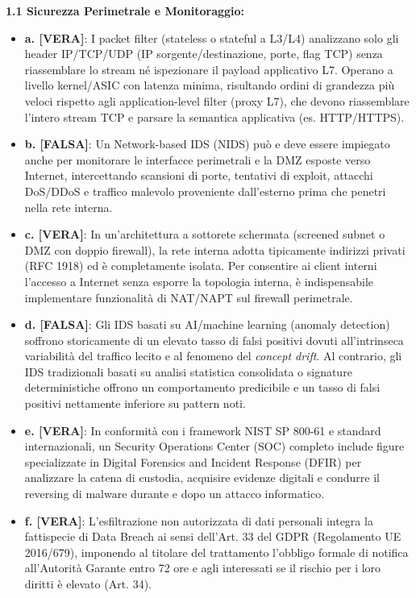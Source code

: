 \documentclass[11pt,a4paper]{article}
\begin{document}
\begin{solutionbox}
\textbf{1.1 Sicurezza Perimetrale e Monitoraggio:}
\begin{itemize}
    \item \textbf{a. [VERA]}: I packet filter (stateless o stateful a L3/L4) analizzano solo gli header IP/TCP/UDP (IP sorgente/destinazione, porte, flag TCP) senza riassemblare lo stream né ispezionare il payload applicativo L7. Operano a livello kernel/ASIC con latenza minima, risultando ordini di grandezza più veloci rispetto agli application-level filter (proxy L7), che devono riassemblare l'intero stream TCP e parsare la semantica applicativa (es. HTTP/HTTPS).
    \item \textbf{b. [FALSA]}: Un Network-based IDS (NIDS) può e deve essere impiegato anche per monitorare le interfacce perimetrali e la DMZ esposte verso Internet, intercettando scansioni di porte, tentativi di exploit, attacchi DoS/DDoS e traffico malevolo proveniente dall'esterno prima che penetri nella rete interna.
    \item \textbf{c. [VERA]}: In un'architettura a sottorete schermata (screened subnet o DMZ con doppio firewall), la rete interna adotta tipicamente indirizzi privati (RFC 1918) ed è completamente isolata. Per consentire ai client interni l'accesso a Internet senza esporre la topologia interna, è indispensabile implementare funzionalità di NAT/NAPT sul firewall perimetrale.
    \item \textbf{d. [FALSA]}: Gli IDS basati su AI/machine learning (anomaly detection) soffrono storicamente di un elevato tasso di falsi positivi dovuti all'intrinseca variabilità del traffico lecito e al fenomeno del \textit{concept drift}. Al contrario, gli IDS tradizionali basati su analisi statistica consolidata o signature deterministiche offrono un comportamento predicibile e un tasso di falsi positivi nettamente inferiore su pattern noti.
    \item \textbf{e. [VERA]}: In conformità con i framework NIST SP 800-61 e standard internazionali, un Security Operations Center (SOC) completo include figure specializzate in Digital Forensics and Incident Response (DFIR) per analizzare la catena di custodia, acquisire evidenze digitali e condurre il reversing di malware durante e dopo un attacco informatico.
    \item \textbf{f. [VERA]}: L'esfiltrazione non autorizzata di dati personali integra la fattispecie di Data Breach ai sensi dell'Art. 33 del GDPR (Regolamento UE 2016/679), imponendo al titolare del trattamento l'obbligo formale di notifica all'Autorità Garante entro 72 ore e agli interessati se il rischio per i loro diritti è elevato (Art. 34).

\end{itemize}
\end{solutionbox}
\end{document}
